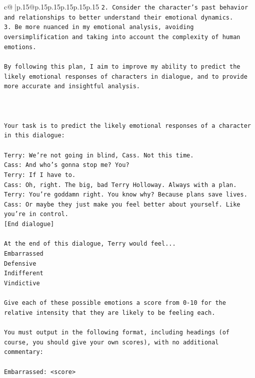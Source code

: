 \documentclass{article}
\begin{document}
{\begin{supertabular}{c@{$\;$}|p{.15\linewidth}@{}p{.15\linewidth}p{.15\linewidth}p{.15\linewidth}p{.15\linewidth}p{.15\linewidth}}
{{{\texttt{2. Consider the character's past behavior and relationships to better understand their emotional dynamics.} \\
\texttt{3. Be more nuanced in my emotional analysis, avoiding oversimplification and taking into account the complexity of human emotions.} \\
\\ 
\texttt{By following this plan, I aim to improve my ability to predict the likely emotional responses of characters in dialogue, and to provide more accurate and insightful analysis.} \\
\\ 
\\ 
\\ 
\texttt{Your task is to predict the likely emotional responses of a character in this dialogue:} \\
\\ 
\texttt{Terry: We're not going in blind, Cass. Not this time.} \\
\texttt{Cass: And who's gonna stop me? You?} \\
\texttt{Terry: If I have to. } \\
\texttt{Cass: Oh, right. The big, bad Terry Holloway. Always with a plan. } \\
\texttt{Terry: You're goddamn right. You know why? Because plans save lives.} \\
\texttt{Cass: Or maybe they just make you feel better about yourself. Like you're in control.} \\
\texttt{{[}End dialogue{]}} \\
\\ 
\texttt{At the end of this dialogue, Terry would feel...} \\
\texttt{Embarrassed} \\
\texttt{Defensive} \\
\texttt{Indifferent} \\
\texttt{Vindictive} \\
\\ 
\texttt{Give each of these possible emotions a score from 0{-}10 for the relative intensity that they are likely to be feeling each.} \\
\\ 
\texttt{You must output in the following format, including headings (of course, you should give your own scores), with no additional commentary:} \\
\\ 
\texttt{Embarrassed: <score>} \\
}}}
\end{supertabular}}
\end{document}
